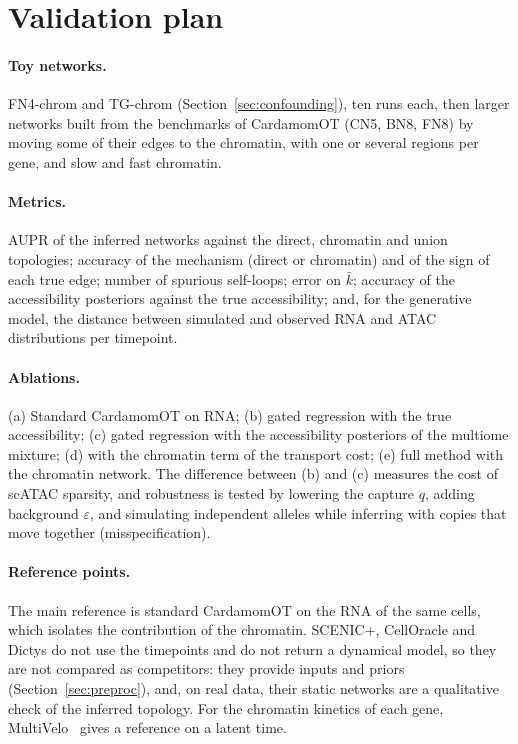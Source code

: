 \documentclass[a4paper, 11pt]{article}
\theoremstyle{plain}
\theoremstyle{remark}
\begin{document}
\section{Validation plan}\label{sec:validation}

\paragraph{Toy networks.} FN4-chrom and TG-chrom (Section~\ref{sec:confounding}), ten runs each, then larger networks built from the benchmarks of CardamomOT (CN5, BN8, FN8) by moving some of their edges to the chromatin, with one or several regions per gene, and slow and fast chromatin.

\paragraph{Metrics.} AUPR of the inferred networks against the direct, chromatin and union topologies; accuracy of the mechanism (direct or chromatin) and of the sign of each true edge; number of spurious self-loops; error on $\bar k$; accuracy of the accessibility posteriors against the true accessibility; and, for the generative model, the distance between simulated and observed RNA and ATAC distributions per timepoint.

\paragraph{Ablations.} (a) Standard CardamomOT on RNA; (b) gated regression with the true accessibility; (c) gated regression with the accessibility posteriors of the multiome mixture; (d) with the chromatin term of the transport cost; (e) full method with the chromatin network. The difference between (b) and (c) measures the cost of scATAC sparsity, and robustness is tested by lowering the capture $q$, adding background $\varepsilon$, and simulating independent alleles while inferring with copies that move together (misspecification).

\paragraph{Reference points.} The main reference is standard CardamomOT on the RNA of the same cells, which isolates the contribution of the chromatin. SCENIC+, CellOracle and Dictys do not use the timepoints and do not return a dynamical model, so they are not compared as competitors: they provide inputs and priors (Section~\ref{sec:preproc}), and, on real data, their static networks are a qualitative check of the inferred topology. For the chromatin kinetics of each gene, MultiVelo~\cite{li2023multivelo} gives a reference on a latent time.
\end{document}
